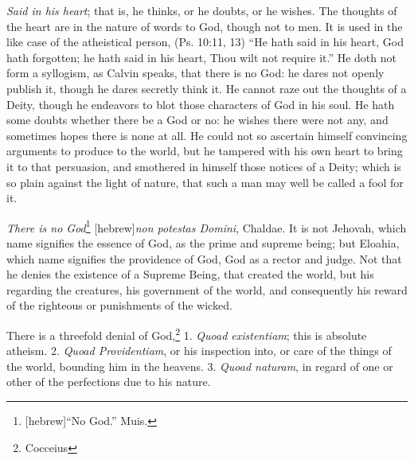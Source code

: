 \documentclass[a5paper]{book}
\newcommand{\heb}{[hebrew]}
\begin{document}
\emph{Said in his heart}; that is, he thinks, or he doubts, or he wishes.
The thoughts of the heart are in the nature of words to God, though not to men. 
It is used in the like case of the atheistical person, 
    (Ps. 10:11, 13) ``He hath said in his heart, God hath forgotten; 
    he hath said in his heart, Thou wilt not require it.'' 
He doth not form a syllogism, as Calvin speaks, that there is no God: 
    he dares not %
    openly publish it, though he dares secretly think it. 
He cannot raze out the thoughts of a Deity, 
    though he endeavors to blot those characters of God in his soul. 
He hath some doubts whether there be a God or no: 
    he wishes there were not any, 
    and sometimes hopes there is none at all. 
He could not so ascertain himself convincing arguments to produce to the world, 
    but he tampered with his own heart to bring it to that persuasion, 
    and smothered in himself those notices of a Deity; 
    which is so plain against the light of nature, 
    that such a man may well be called a fool for it.

\emph{There is no God}\footnote{\heb ``No God.'' Muis.} 
    \heb \emph{non potestas Domini}, Chaldae. 
It is not Jehovah, which name signifies the essence of God, 
    as the prime and supreme being; 
    but Eloahia, which name signifies the providence of God, 
    God as a rector and judge. 
Not that he denies the existence of a Supreme Being, 
    that created the world, but his regarding the creatures, 
    his government of the world, 
    and consequently his reward of the righteous or punishments of the wicked.

There is a threefold denial of God,\footnote{Cocceius} 
    1. \emph{Quoad existentiam}; this is absolute atheism. 
    2. \emph{Quoad Providentiam}, or his inspection into, 
    or care of the things of the world, bounding him in the heavens. 
    3. \emph{Quoad naturam}, in regard of one or other of the perfections 
    due to his nature. 
\end{document}
